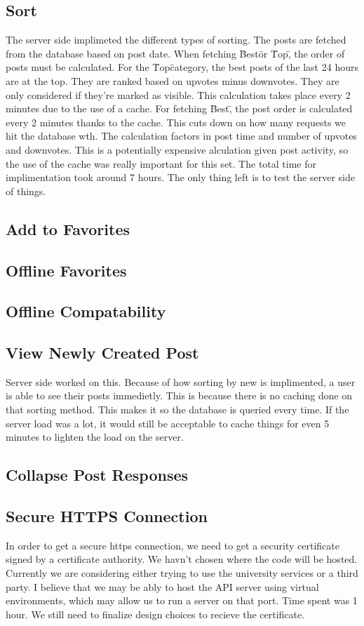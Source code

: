 \documentclass[12pt]{article}
\begin{document}
      \subsection{Sort}
      The server side implimeted the different types of sorting.  The posts are fetched from the database based on post date.  When fetching \"Best\" or \"Top\", the order of posts must be calculated.  For the \"Top\" category, the best posts of the last 24 hours are at the top.  They are ranked based on upvotes minus downvotes.  They are only considered if they're marked as visible.  This calculation takes place every 2 minutes due to the use of a cache.  For fetching \"Best\", the post order is calculated every 2 minutes thanks to the cache.  This cuts down on how many requests we hit the database wth.  The calculation factors in post time and  number of upvotes and downvotes.  This is a potentially expensive alculation given post activity, so the use of the cache was really important for this set.  The total time for implimentation took around 7 hours.  The only thing left is to test the server side of things.
      \subsection{Add to Favorites}
      \subsection{Offline Favorites}
      \subsection{Offline Compatability}
      \subsection{View Newly Created Post}
      Server side worked on this.  Because of how sorting by new is implimented, a user is able to see their posts immedietly.  This is because there is no caching done on that sorting method.  This makes it so the database is queried every time.  If the server load was a lot, it would still be acceptable to cache things for even 5 minutes to lighten the load on the server.
      \subsection{Collapse Post Responses}
      \subsection{Secure HTTPS Connection}
      In order to get a secure https connection, we need to get a security certificate signed by a certificate authority.  We havn't chosen where the code will be hosted.  Currently we are considering either trying to use the university services or a third party.  I believe that we may be ably to host the API server using virtual environments, which may allow us to run a server on that port.  Time spent was 1 hour.  We still need to finalize design choices to recieve the certificate.
\end{document}

